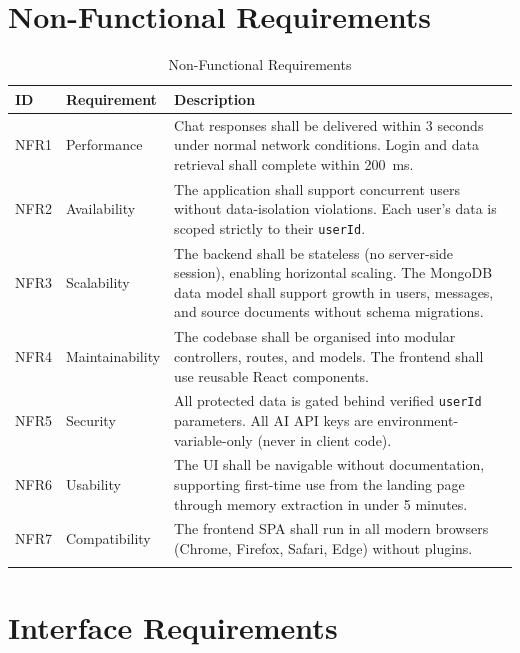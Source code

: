 \documentclass[12pt,a4paper]{report}
\begin{document}
\section{Non-Functional Requirements}

\begin{longtable}{@{}p{0.5cm} p{3.5cm} p{9.5cm}@{}}
\toprule
\textbf{ID} & \textbf{Requirement} & \textbf{Description} \\
\midrule
\endhead
NFR1 & Performance & Chat responses shall be delivered within 3 seconds under normal network conditions. Login and data retrieval shall complete within 200~ms. \\
NFR2 & Availability & The application shall support concurrent users without data-isolation violations. Each user's data is scoped strictly to their \texttt{userId}. \\
NFR3 & Scalability & The backend shall be stateless (no server-side session), enabling horizontal scaling. The MongoDB data model shall support growth in users, messages, and source documents without schema migrations. \\
NFR4 & Maintainability & The codebase shall be organised into modular controllers, routes, and models. The frontend shall use reusable React components. \\
NFR5 & Security & All protected data is gated behind verified \texttt{userId} parameters. All AI API keys are environment-variable-only (never in client code). \\
NFR6 & Usability & The UI shall be navigable without documentation, supporting first-time use from the landing page through memory extraction in under 5 minutes. \\
NFR7 & Compatibility & The frontend SPA shall run in all modern browsers (Chrome, Firefox, Safari, Edge) without plugins. \\
\bottomrule
\caption{Non-Functional Requirements}
\label{tab:nfr}
\end{longtable}

\section{Interface Requirements}
\end{document}
